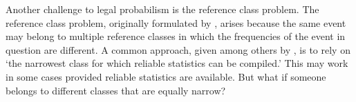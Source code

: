 \documentclass{article}
\begin{document}
\label{sec:reference}


Another challenge to legal probabilism is the reference class problem. 
The reference class problem, originally formulated by  \cite{venn1866logic}, arises because the same event may belong to multiple reference  classes in which the frequencies of the event in question are different. A common approach, given among others by \citet[374]{Reichenbach1949}, is to rely on `the narrowest class for which reliable statistics can be compiled.' 
This may work in some cases provided reliable statistics are available. 
But what if someone belongs to different classes that are equally narrow? 
%
%
\end{document}
